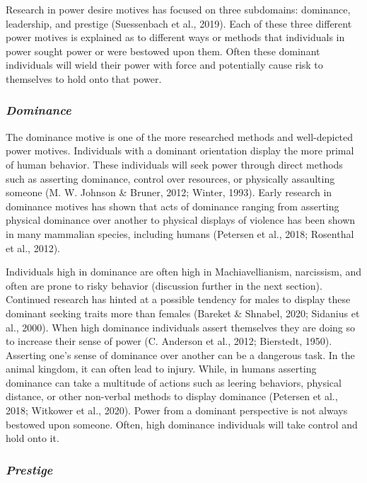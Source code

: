 \documentclass[
  donotrepeattitle,doc, 12pt, a4paper,floatsintext]{apa7}
\begin{document}
Research in power desire motives has focused on three subdomains: dominance, leadership, and prestige (Suessenbach et al., 2019). Each of these three different power motives is explained as to different ways or methods that individuals in power sought power or were bestowed upon them. Often these dominant individuals will wield their power with force and potentially cause risk to themselves to hold onto that power.

\hypertarget{dominance}{%
\subsubsection{\texorpdfstring{\emph{Dominance}}{Dominance}}\label{dominance}}

The dominance motive is one of the more researched methods and well-depicted power motives. Individuals with a dominant orientation display the more primal of human behavior. These individuals will seek power through direct methods such as asserting dominance, control over resources, or physically assaulting someone (M. W. Johnson \& Bruner, 2012; Winter, 1993). Early research in dominance motives has shown that acts of dominance ranging from asserting physical dominance over another to physical displays of violence has been shown in many mammalian species, including humans (Petersen et al., 2018; Rosenthal et al., 2012).

Individuals high in dominance are often high in Machiavellianism, narcissism, and often are prone to risky behavior (discussion further in the next section). Continued research has hinted at a possible tendency for males to display these dominant seeking traits more than females (Bareket \& Shnabel, 2020; Sidanius et al., 2000). When high dominance individuals assert themselves they are doing so to increase their sense of power (C. Anderson et al., 2012; Bierstedt, 1950). Asserting one's sense of dominance over another can be a dangerous task. In the animal kingdom, it can often lead to injury. While, in humans asserting dominance can take a multitude of actions such as leering behaviors, physical distance, or other non-verbal methods to display dominance (Petersen et al., 2018; Witkower et al., 2020). Power from a dominant perspective is not always bestowed upon someone. Often, high dominance individuals will take control and hold onto it.

\hypertarget{prestige}{%
\subsubsection{\texorpdfstring{\emph{Prestige}}{Prestige}}\label{prestige}}
\end{document}
